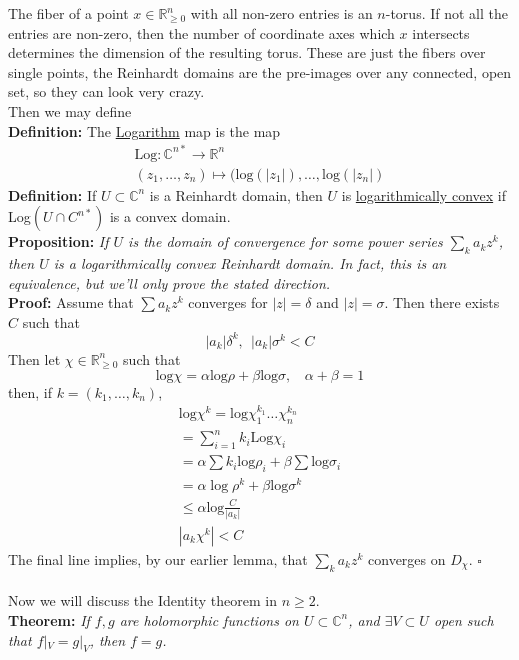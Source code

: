 \documentclass[12pt]{report}
\theoremstyle{definition}
\theoremstyle{remark}
\numberwithin{equation}{section}
\theoremstyle{definition}
\newcommand{\bb}[1]{\mathbb{#1}}
\newcommand{\mqed}{\hfill\newline\null \hfill$\square$\\ }
\begin{document}
The fiber of a point $x \in \bb R^n_{\geq 0}$ with all non-zero entries is an $n$-torus. If not all the entries are non-zero, then the number of coordinate axes which $x$ intersects determines the dimension of the resulting torus. These are just the fibers over single points, the Reinhardt domains are the pre-images over any connected, open set, so they can look very crazy. \\
Then we may define\\
\textbf{Definition: }The \underline{Logarithm} map is the map 
\begin{gather*}
	\text{Log}: \bb C^{n*} \to \bb R^n\\
	(z_1,\dots,z_n) \mapsto (\text{log}(|z_1|), \dots, \text{log}(|z_n|)
\end{gather*}
\textbf{Definition: }If $U \subset \bb C^n$ is a Reinhardt domain, then $U$ is \underline{logarithmically convex} if Log$(U \cap C^{n*})$ is a convex domain. \\
\textbf{Proposition:} \textit{If $U$ is the domain of convergence for some power series $\sum_k a_k z^k$, then $U$ is a logarithmically convex Reinhardt domain. In fact, this is an equivalence, but we'll only prove the stated direction.}\\
\textbf{Proof: }Assume that $\sum a_kz^k$ converges for $|z| = \delta$ and $|z| = \sigma$. Then there exists $C$ such that 
$$
	|a_k| \delta^k,\ \ |a_k|\sigma^k < C
$$
Then let $\chi \in \bb R^n_{\geq 0}$ such that 
$$
	\text{log}\chi = \alpha \text{log} \rho + \beta \text{log}\sigma,\ \ \ \ \alpha + \beta = 1
$$
then, if $k = (k_1,\dots,k_n)$,
\begin{gather*}
	\text{log}\chi^k = \text{log}\chi_1^{k_1} \dots \chi_n^{k_n}\\
	= \sum_{i = 1}^n k_i\text{Log}\chi_i\\
	= \alpha \sum k_i\text{log}\rho_i + \beta \sum\text{log}\sigma_i\\
	= \alpha\log\rho^k + \beta\text{log}\sigma^k\\
\leq \alpha \text{log}\frac{C}{|a_k|}\\
|a_k\chi^k| < C
\end{gather*}
The final line implies, by our earlier lemma, that $\sum_k a_kz^k$ converges on $D_\chi$. 
\mqed
\\
Now we will discuss the Identity theorem in $n \geq 2$. \\
\textbf{Theorem: }\textit{If $f,g$ are holomorphic functions on $U \subset \bb C^n$, and $\exists V \subset U$ open such that $f|_V = g|_V$, then $f = g$.}\\
\end{document}
